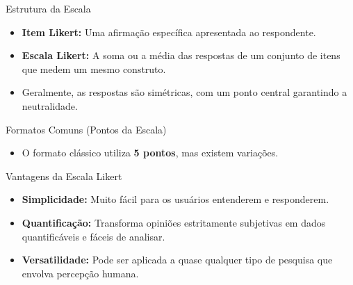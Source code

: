 \documentclass[aspectratio=169]{beamer}
\begin{document}
\begin{frame}{Estrutura da Escala}
    \begin{itemize}
        \item \textbf{Item Likert:} Uma afirmação específica apresentada ao respondente.
        \item \textbf{Escala Likert:} A soma ou a média das respostas de um conjunto de itens que medem um mesmo construto.
        \item Geralmente, as respostas são simétricas, com um ponto central garantindo a neutralidade.
    \end{itemize}
\end{frame}

\begin{frame}{Formatos Comuns (Pontos da Escala)}
    \begin{itemize}
        \item O formato clássico utiliza \textbf{5 pontos}, mas existem variações.
    \end{itemize}
    \vspace{0.3cm}
    \begin{center}
    \end{center}
\end{frame}

\begin{frame}{Vantagens da Escala Likert}
    \begin{itemize}
        \item \textbf{Simplicidade:} Muito fácil para os usuários entenderem e responderem.
        \item \textbf{Quantificação:} Transforma opiniões estritamente subjetivas em dados quantificáveis e fáceis de analisar.
        \item \textbf{Versatilidade:} Pode ser aplicada a quase qualquer tipo de pesquisa que envolva percepção humana.
    \end{itemize}
\end{frame}
\end{document}
